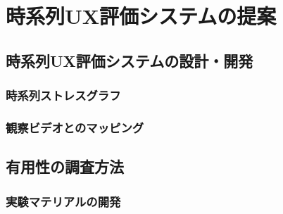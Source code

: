 \chapter{時系列UX評価システムの提案}
\label{chap:sequential}

\section{時系列UX評価システムの設計・開発}

\subsection{時系列ストレスグラフ}

\subsection{観察ビデオとのマッピング}

\section{有用性の調査方法}

\subsection{実験マテリアルの開発}

